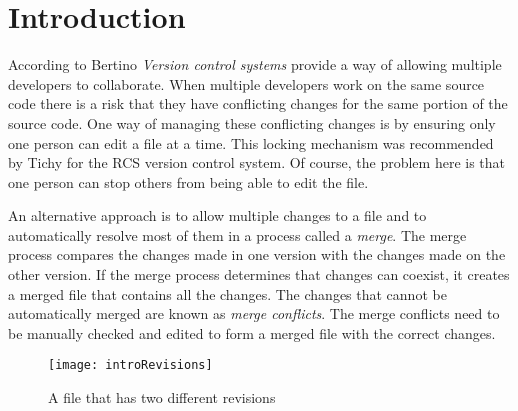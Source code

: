 
\chapter{Introduction}\label{C:intro}

According to Bertino \cite{Bertino2012} \emph{Version control systems} provide a way of allowing multiple developers to collaborate. When multiple developers work on the same source code there is a risk that they have conflicting changes for the same portion of the source code.  One way of managing these conflicting changes is by ensuring only one person can edit a file at a time. This locking mechanism was recommended by Tichy \cite{Tichy1982} for the RCS version control system. Of course, the problem here is that one person can stop others from being able to edit the file. 

An alternative approach is to allow multiple changes to a file and to automatically resolve most of them in a process called a \emph{merge}.  The merge process compares the changes made in one version with the changes made on the other version. If the merge process determines that changes can coexist, it creates a merged file that contains all the changes. The changes that cannot be automatically merged are known as \emph{merge conflicts}.  The merge conflicts need to be manually checked and edited to form a merged file with the correct changes.

\begin{figure}[!t]
 \begin{center}
 \texttt{[image: introRevisions]}
 \end{center}
 \caption{A file that has two different revisions}
 \label{fig:introRevisions}
\end{figure}



